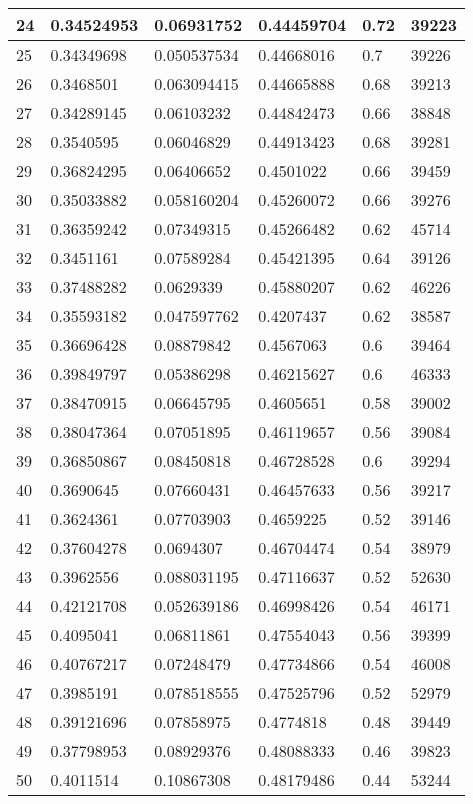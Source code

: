 \begin{longtable}{|l|l|l|l|l|l|}
24 & 0.34524953 & 0.06931752 & 0.44459704 & 0.72 & 39223 \\ \hline 
25 & 0.34349698 & 0.050537534 & 0.44668016 & 0.7 & 39226 \\ \hline 
26 & 0.3468501 & 0.063094415 & 0.44665888 & 0.68 & 39213 \\ \hline 
27 & 0.34289145 & 0.06103232 & 0.44842473 & 0.66 & 38848 \\ \hline 
28 & 0.3540595 & 0.06046829 & 0.44913423 & 0.68 & 39281 \\ \hline 
29 & 0.36824295 & 0.06406652 & 0.4501022 & 0.66 & 39459 \\ \hline 
30 & 0.35033882 & 0.058160204 & 0.45260072 & 0.66 & 39276 \\ \hline 
31 & 0.36359242 & 0.07349315 & 0.45266482 & 0.62 & 45714 \\ \hline 
32 & 0.3451161 & 0.07589284 & 0.45421395 & 0.64 & 39126 \\ \hline 
33 & 0.37488282 & 0.0629339 & 0.45880207 & 0.62 & 46226 \\ \hline 
34 & 0.35593182 & 0.047597762 & 0.4207437 & 0.62 & 38587 \\ \hline 
35 & 0.36696428 & 0.08879842 & 0.4567063 & 0.6 & 39464 \\ \hline 
36 & 0.39849797 & 0.05386298 & 0.46215627 & 0.6 & 46333 \\ \hline 
37 & 0.38470915 & 0.06645795 & 0.4605651 & 0.58 & 39002 \\ \hline 
38 & 0.38047364 & 0.07051895 & 0.46119657 & 0.56 & 39084 \\ \hline 
39 & 0.36850867 & 0.08450818 & 0.46728528 & 0.6 & 39294 \\ \hline 
40 & 0.3690645 & 0.07660431 & 0.46457633 & 0.56 & 39217 \\ \hline 
41 & 0.3624361 & 0.07703903 & 0.4659225 & 0.52 & 39146 \\ \hline 
42 & 0.37604278 & 0.0694307 & 0.46704474 & 0.54 & 38979 \\ \hline 
43 & 0.3962556 & 0.088031195 & 0.47116637 & 0.52 & 52630 \\ \hline 
44 & 0.42121708 & 0.052639186 & 0.46998426 & 0.54 & 46171 \\ \hline 
45 & 0.4095041 & 0.06811861 & 0.47554043 & 0.56 & 39399 \\ \hline 
46 & 0.40767217 & 0.07248479 & 0.47734866 & 0.54 & 46008 \\ \hline 
47 & 0.3985191 & 0.078518555 & 0.47525796 & 0.52 & 52979 \\ \hline 
48 & 0.39121696 & 0.07858975 & 0.4774818 & 0.48 & 39449 \\ \hline 
49 & 0.37798953 & 0.08929376 & 0.48088333 & 0.46 & 39823 \\ \hline 
50 & 0.4011514 & 0.10867308 & 0.48179486 & 0.44 & 53244 \\ \hline 
\end{longtable}